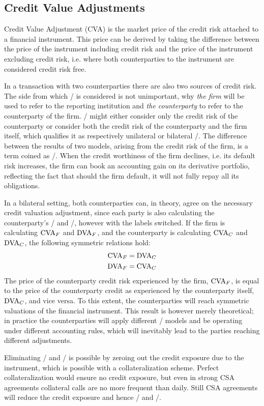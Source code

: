 \documentclass[../../../main.tex]{subfiles}
\begin{document}
    \subsection{Credit Value Adjustments}
        Credit Value Adjustment (CVA) is the market price of the credit risk attached to a financial instrument.
        This price can be derived by taking the difference between the price of the instrument including credit risk
        and the price of the instrument excluding credit risk, 
        i.e. where both counterparties to the instrument are considered credit risk free.

        In a transaction with two counterparties there are also two sources of credit risk.
        The side from which \CVA/ is considered is not unimportant, 
        why \textit{the firm} will be used to refer to the reporting institution 
        and \textit{the counterparty} to refer to the counterparty of the firm.
        \CVA/ might either consider only the credit risk of the counterparty 
        or consider both the credit risk of the counterparty and the firm itself,
        which qualifies it as respectively unilateral or bilateral \CVA/.
        The difference between the results of two models, arising from the credit risk of the firm,
        is a term coined as \DVA/.
        When the credit worthiness of the firm declines, i.e. its default risk increases,
        the firm can book an accounting gain on its derivative portfolio,
        reflecting the fact that should the firm default, it will not fully repay all its obligations.

        In a bilateral setting, both counterparties can, in theory, agree on the necessary credit valuation adjustment,
        since each party is also calculating the counterparty's \CVA/ and \DVA/, however with the labels switched.
        If the firm is calculating $\CVA/_{F}$ and $\DVA/_{F}$, 
        and the counterparty is calculating $\CVA/_{C}$ and $\DVA/_{C}$,
        the following symmetric relations hold:
            \begin{align*}
                \CVA/_{F} &= \DVA/_{C} \\
                \DVA/_{F} &= \CVA/_{C}
            \end{align*}
        The price of the counterparty credit risk experienced by the firm, $\CVA/_{F}$,
        is equal to the price of the counterparty credit as experienced by the counterparty itself, $\DVA/_{C}$,
        and vice versa.
        To this extent, the counterparties will reach symmetric valuations of the financial instrument. 
        This result is however merely theoretical; 
        in practice the counterparties will apply different \CVA/ models
        and be operating under different accounting rules, 
        which will inevitably lead to the parties reaching different adjustments. 
        
        Eliminating \CVA/ and \DVA/ is possible by zeroing out the credit exposure due to the instrument,
        which is possible with a collateralization scheme. 
        Perfect collateralization would ensure no credit exposure,
        but even in strong CSA agreements collateral calls are no more frequent than daily.
        Still CSA agreements will reduce the credit exposure and hence \CVA/ and \DVA/.
\end{document}
